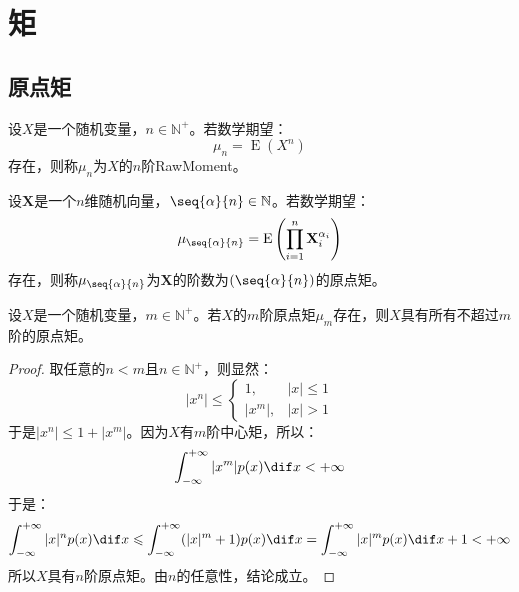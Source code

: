 \section{矩}

\subsection{原点矩}
\begin{definition}
	设$X$是一个随机变量，$n\in\mathbb{N}^+$。若数学期望：
	\begin{equation*}
		\mu_n=\operatorname{E}(X^n)
	\end{equation*}
	存在，则称$\mu_n$为$X$的$n$阶\gls{RawMoment}。
\end{definition}
\begin{definition}
	设$\mathbf{X}$是一个$n$维随机向量，$\seq{\alpha}{n}\in\mathbb{N}$。若数学期望：
	\begin{equation*}
		\mu_{\seq{\alpha}{n}}=\operatorname{E}\left(\prod_{i=1}^{n}\mathbf{X}_i^{\alpha_i}\right)
	\end{equation*}
	存在，则称$\mu_{\seq{\alpha}{n}}$为$\mathbf{X}$的阶数为$(\seq{\alpha}{n})$的原点矩。
\end{definition}
\begin{theorem}\label{theo:LowerRawMoment}
	设$X$是一个随机变量，$m\in\mathbb{N}^+$。若$X$的$m$阶原点矩$\mu_{m}$存在，则$X$具有所有不超过$m$阶的原点矩。
\end{theorem}
\begin{proof}
	取任意的$n<m$且$n\in\mathbb{N}^+$，则显然：
	\begin{equation*}
		|x^n|\leqslant
		\begin{cases}
			1, & |x|\leqslant1 \\
			|x^m|, & |x|>1
		\end{cases}
	\end{equation*}
	于是$|x^n|\leqslant1+|x^m|$。因为$X$有$m$阶中心矩，所以：
	\begin{equation*}
		\int_{-\infty}^{+\infty}|x^m|p(x)\dif x<+\infty
	\end{equation*}
	于是：
	\begin{equation*}
		\int_{-\infty}^{+\infty}|x|^np(x)\dif x
		\leqslant\int_{-\infty}^{+\infty}(|x|^m+1)p(x)\dif x
		=\int_{-\infty}^{+\infty}|x|^mp(x)\dif x+1<+\infty
	\end{equation*}
	所以$X$具有$n$阶原点矩。由$n$的任意性，结论成立。
\end{proof}

